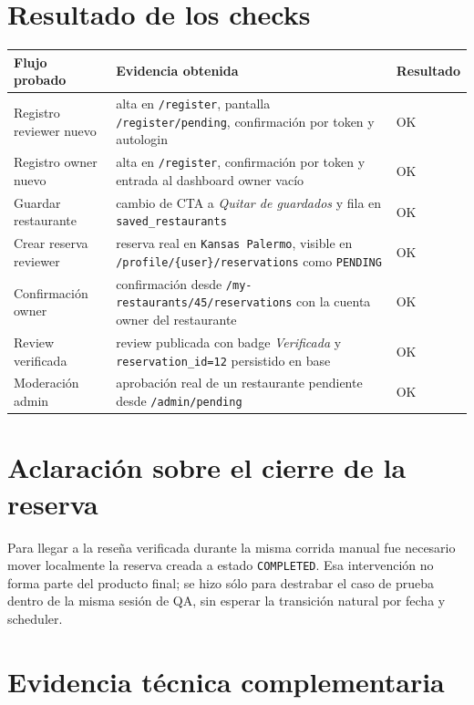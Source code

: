 \documentclass[11pt,a4paper]{report}
\newcommand{\code}[1]{\nolinkurl{#1}}
\begin{document}
\section{Resultado de los checks}

\begin{longtable}{p{}p{}p{}}
\toprule
\textbf{Flujo probado} & \textbf{Evidencia obtenida} & \textbf{Resultado} \\
\midrule
\endhead
Registro reviewer nuevo & alta en \code{/register}, pantalla \code{/register/pending}, confirmaci\'on por token y autologin & OK \\
Registro owner nuevo & alta en \code{/register}, confirmaci\'on por token y entrada al dashboard owner vac\'io & OK \\
Guardar restaurante & cambio de CTA a \emph{Quitar de guardados} y fila en \code{saved\_restaurants} & OK \\
Crear reserva reviewer & reserva real en \code{Kansas Palermo}, visible en \code{/profile/\{user\}/reservations} como \code{PENDING} & OK \\
Confirmaci\'on owner & confirmaci\'on desde \code{/my-restaurants/45/reservations} con la cuenta owner del restaurante & OK \\
Review verificada & review publicada con badge \emph{Verificada} y \code{reservation\_id=12} persistido en base & OK \\
Moderaci\'on admin & aprobaci\'on real de un restaurante pendiente desde \code{/admin/pending} & OK \\
\bottomrule
\end{longtable}

\section{Aclaraci\'on sobre el cierre de la reserva}

Para llegar a la rese\~na verificada durante la misma corrida manual fue necesario mover localmente la reserva creada a estado \code{COMPLETED}. Esa intervenci\'on no forma parte del producto final; se hizo s\'olo para destrabar el caso de prueba dentro de la misma sesi\'on de QA, sin esperar la transici\'on natural por fecha y scheduler.

\section{Evidencia t\'ecnica complementaria}
\end{document}
